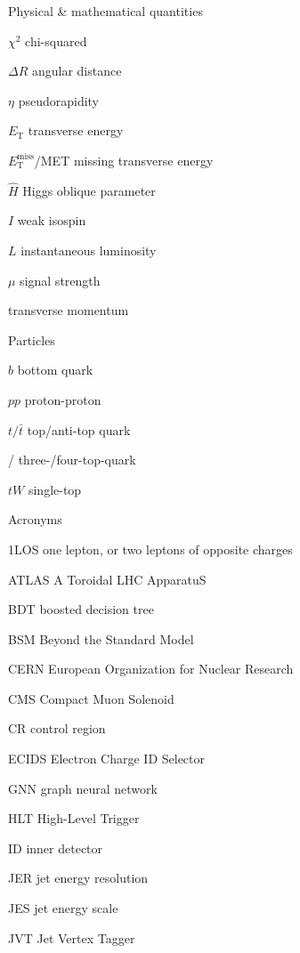 \documentclass{msuphddissertation}
\begin{document}
\begin{abbrev}
Physical \& mathematical quantities
\begin{abbreviations}
\item[$\chi^2$] chi-squared
\item[$\Delta R$] angular distance
\item[$\eta$] pseudorapidity
\item[$E_\mathrm{T}$] transverse energy
\item[$E_\mathrm{T}^\mathrm{miss}$/MET] missing transverse energy
\item[$\hat{H}$] Higgs oblique parameter
\item[$I$] weak isospin
\item[$L$] instantaneous luminosity
\item[$\mu$] signal strength
\item[\pT] transverse momentum
\end{abbreviations}
Particles
\begin{abbreviations}
\item[$b$] bottom quark
\item[$pp$] proton-proton
\item[$t/\bar{t}$] top/anti-top quark
\item[\ttt /\tttt] three-/four-top-quark
\item[$tW$] single-top
\end{abbreviations}
Acronyms
\begin{abbreviations}
\item[1LOS] one lepton, or two leptons of opposite charges
\item[ATLAS] A Toroidal LHC ApparatuS
\item[BDT] boosted decision tree
\item[BSM] Beyond the Standard Model
\item[CERN] European Organization for Nuclear Research
\item[CMS] Compact Muon Solenoid
\item[CR] control region
\item[ECIDS] Electron Charge ID Selector
\item[GNN] graph neural network
\item[HLT] High-Level Trigger
\item[ID] inner detector
\item[JER] jet energy resolution
\item[JES] jet energy scale
\item[JVT] Jet Vertex Tagger

\end{abbreviations}
\end{abbrev}
\end{document}
